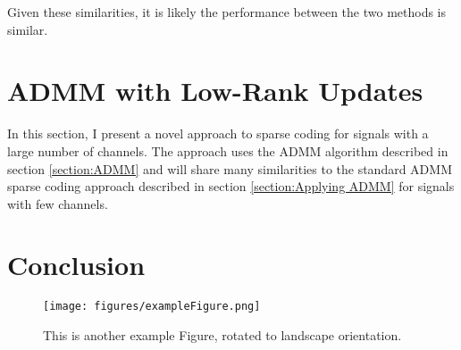 Given these similarities, it is likely the performance between the two methods is similar.

\section{ADMM with Low-Rank Updates}
In this section, I present a novel approach to sparse coding for signals with a large number of channels. The approach uses the ADMM algorithm described in section \ref{section:ADMM} and will share many similarities to the standard ADMM sparse coding approach described in section \ref{section:Applying ADMM} for signals with few channels.
\section{Conclusion}

\begin{sidewaysfigure}
\texttt{[image: figures/exampleFigure.png]}
\caption{This is another example Figure, rotated to landscape orientation.}
\label{LandscapeFigure}
\end{sidewaysfigure}
